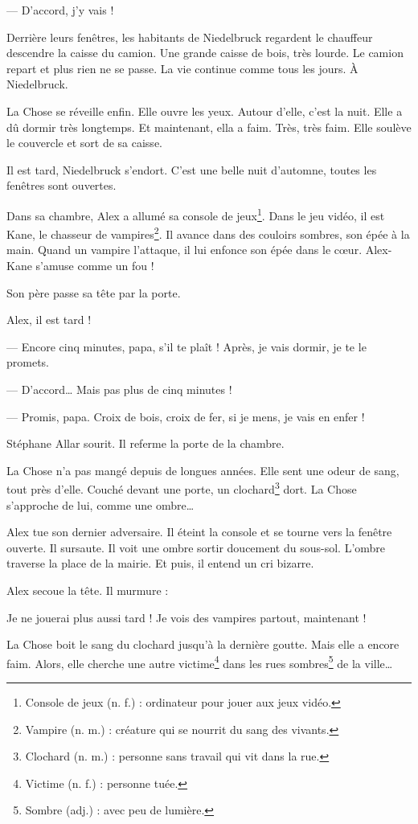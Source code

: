 --- D'accord, j'y vais ! \fg{}

Derrière leurs fenêtres, les habitants de Niedelbruck regardent le chauffeur descendre la caisse du camion. Une grande
caisse de bois, très lourde. Le camion repart et plus rien ne se passe. La vie continue comme tous les jours. À
Niedelbruck.

La Chose se réveille enfin. Elle ouvre les yeux. Autour d'elle, c'est la nuit. Elle a dû dormir très longtemps. Et
maintenant, ella a faim. Très, très faim. Elle soulève le couvercle et sort de sa caisse.

Il est tard, Niedelbruck s'endort. C'est une belle nuit d'automne, toutes les fenêtres sont ouvertes.

Dans sa chambre, Alex a allumé sa console de jeux\footnote{Console de jeux (n. f.) : ordinateur pour jouer aux jeux
vidéo.}. Dans le jeu vidéo, il est Kane, le chasseur de vampires\footnote{Vampire (n. m.) : créature qui se nourrit du
sang des vivants.}. Il avance dans des couloirs sombres, son épée à la main. Quand un vampire l'attaque, il lui enfonce
son épée dans le c\oe{}ur. Alex-Kane s'amuse comme un fou !

Son père passe sa tête par la porte.

\og Alex, il est tard !

--- Encore cinq minutes, papa, s'il te plaît ! Après, je vais dormir, je te le promets.

--- D'accord\ldots{} Mais pas plus de cinq minutes !

--- Promis, papa. Croix de bois, croix de fer, si je mens, je vais en enfer ! \fg{}

Stéphane Allar sourit. Il referme la porte de la chambre.

La Chose n'a pas mangé depuis de longues années. Elle sent une odeur de sang, tout près d'elle. Couché devant une porte,
un clochard\footnote{Clochard (n. m.) : personne sans travail qui vit dans la rue.} dort. La Chose s'approche de lui,
comme une ombre\ldots{}

Alex tue son dernier adversaire. Il éteint la console et se tourne vers la fenêtre ouverte. Il sursaute. Il voit une
ombre sortir doucement du sous-sol. L'ombre traverse la place de la mairie. Et puis, il entend un cri bizarre.

Alex secoue la tête. Il murmure :

\og Je ne jouerai plus aussi tard ! Je vois des vampires partout, maintenant ! \fg{}

La Chose boit le sang du clochard jusqu'à la dernière goutte. Mais elle a encore faim. Alors, elle cherche une autre
victime\footnote{Victime (n. f.) : personne tuée.} dans les rues sombres\footnote{Sombre (adj.) : avec peu de lumière.}
de la ville\ldots{}
